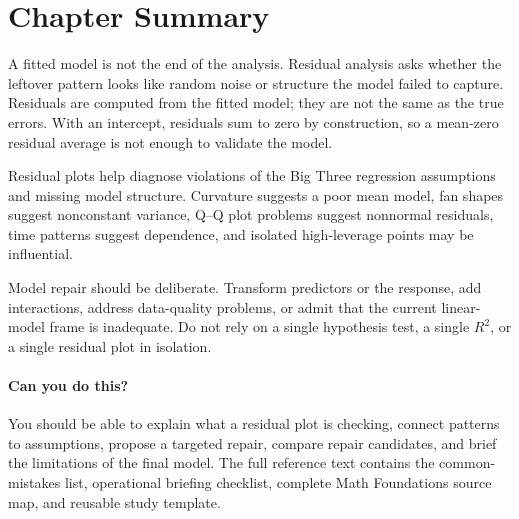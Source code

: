 {\section{Chapter Summary}

A fitted model is not the end of the analysis.  Residual analysis asks whether the leftover pattern looks like random noise or structure the model failed to capture.  Residuals are computed from the fitted model; they are not the same as the true errors.  With an intercept, residuals sum to zero by construction, so a mean-zero residual average is not enough to validate the model.

Residual plots help diagnose violations of the Big Three regression assumptions and missing model structure.  Curvature suggests a poor mean model, fan shapes suggest nonconstant variance, Q--Q plot problems suggest nonnormal residuals, time patterns suggest dependence, and isolated high-leverage points may be influential.

Model repair should be deliberate.  Transform predictors or the response, add interactions, address data-quality problems, or admit that the current linear-model frame is inadequate.  Do not rely on a single hypothesis test, a single \(R^2\), or a single residual plot in isolation.

\paragraph{Can you do this?}
You should be able to explain what a residual plot is checking, connect patterns to assumptions, propose a targeted repair, compare repair candidates, and brief the limitations of the final model.  The full reference text contains the common-mistakes list, operational briefing checklist, complete Math Foundations source map, and reusable study template.
}
